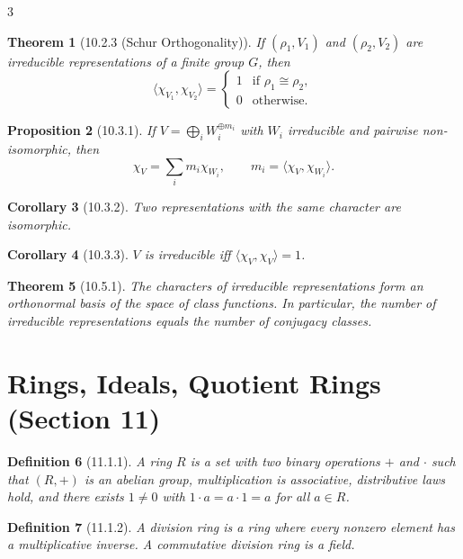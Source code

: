 \documentclass[10pt,landscape]{article}
\newtheorem{theorem}{Theorem}[section]
\newtheorem{definition}[theorem]{Definition}
\newtheorem{proposition}[theorem]{Proposition}
\newtheorem{corollary}[theorem]{Corollary}
\begin{document}
\begin{multicols}{3}
\begin{theorem}[10.2.3 (Schur Orthogonality)]
If $(\rho_1,V_1)$ and $(\rho_2,V_2)$ are irreducible representations of a finite group $G$, then
\[
\langle \chi_{V_1}, \chi_{V_2} \rangle = \begin{cases}
1 & \text{if } \rho_1\cong\rho_2,\\
0 & \text{otherwise}.
\end{cases}
\]
\end{theorem}

\begin{proposition}[10.3.1]
If $V = \bigoplus_{i} W_i^{\oplus m_i}$ with $W_i$ irreducible and pairwise non-isomorphic, then
\[
\chi_V = \sum_i m_i \chi_{W_i}, \qquad
m_i = \langle \chi_V, \chi_{W_i} \rangle.
\]
\end{proposition}

\begin{corollary}[10.3.2]
Two representations with the same character are isomorphic.
\end{corollary}

\begin{corollary}[10.3.3]
$V$ is irreducible iff $\langle \chi_V, \chi_V \rangle = 1$.
\end{corollary}

\begin{theorem}[10.5.1]
The characters of irreducible representations form an orthonormal basis of the space of class functions. In particular, the number of irreducible representations equals the number of conjugacy classes.
\end{theorem}

\section{Rings, Ideals, Quotient Rings (Section 11)}

\begin{definition}[11.1.1]
A ring $R$ is a set with two binary operations $+$ and $\cdot$ such that $(R,+)$ is an abelian group, multiplication is associative, distributive laws hold, and there exists $1\neq 0$ with $1\cdot a = a\cdot 1 = a$ for all $a\in R$.
\end{definition}

\begin{definition}[11.1.2]
A division ring is a ring where every nonzero element has a multiplicative inverse. A commutative division ring is a field.
\end{definition}


\end{multicols}
\end{document}
